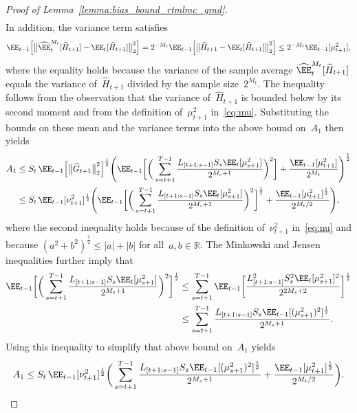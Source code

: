 \documentclass[11pt]{article}
\let\hat\widehat
\begin{document}
\begin{proof}[Proof of Lemma~\ref{lemma:bias_bound_rtmlmc_grad}]
\begin{align*}
\end{align*}
In addition, the variance term satisfies
\begin{align*}
    \EE_{t-1}\Big[\big\|\hat\EE_t^{M_t}[\hat{H}_{t+1}]  - \EE_t[\hat{H}_{t+1}] \big\|_2^2 \Big] = 2^{-M_t} \EE_{t-1}\Big[\big\|\hat{H}_{t+1}  - \EE_t[\hat{H}_{t+1}] \big\|_2^2 \Big] \leq 2^{-M_t} \EE_{t-1}[\mu_{t+1}^{2}],
\end{align*}
where the equality holds because the variance of the sample average $\hat\EE_t^{M_t}[\hat{H}_{t+1}]$ equals the variance of~$\hat{H}_{t+1}$ divided by the sample size~$2^{M_t}$. The inequality follows from the observation that the variance of~$\hat{H}_{t+1}$ is bounded below by its second moment and from the definition of~$\mu_{t+1}^{2}$ in~\eqref{eq:mu}. Substituting the bounds on these mean and the variance terms into the above bound on~$A_1$ then yields
\begin{align*}
    A_1 &\leq S_t \, \EE_{t-1}\Big[\big\|\hat{G}_{t+1}\big\|_2^2\Big]^\frac{1}{2} \Bigg( \EE_{t-1}\bigg[\bigg(\sum_{s=t+1}^{T-1} \frac{L_{[t+1:s-1]} S_s \EE_t[\mu_{s+1}^2]}{2^{M_s + 1}}\bigg)^2\bigg] + \frac{\EE_{t-1}[\mu_{t+1}^2]}{2^{M_t}} \Bigg)^\frac{1}{2}\\
    & \leq S_t \, \EE_{t-1}[\nu_{t+1}^{2}]^\frac{1}{2} \Bigg( \EE_{t-1}\bigg[\bigg(\sum_{s=t+1}^{T-1} \frac{L_{[t+1:s-1]} S_s \EE_t[\mu_{s+1}^2]}{2^{M_s + 1}}\bigg)^2\bigg]^\frac{1}{2} + \frac{\EE_{t-1}[\mu_{t+1}^{2}]^\frac{1}{2}}{2^{M_t/2}} \Bigg),
\end{align*}
where the second inequality holds because of the definition of~$\nu_{t+1}^2$ in~\eqref{eq:nu} and because $(a^2+b^2)^\frac{1}{2} \leq |a| + |b|$ for all~$a,b\in\mathbb R$. The Minkowski and Jensen inequalities further imply that
\begin{align*}
    \EE_{t-1}\bigg[\bigg(\sum_{s=t+1}^{T-1} \frac{L_{[t+1:s-1]} S_s \EE_t[\mu_{s+1}^{2}]}{2^{M_s + 1}}\bigg)^2\bigg]^\frac{1}{2} 
    &\leq \sum_{s=t+1}^{T-1}\EE_{t-1}\bigg[ \frac{L_{[t+1:s-1]}^2 S_s^2 \EE_t[\mu_{s+1}^{2}]^2 }{2^{2M_s + 2}}\bigg]^\frac{1}{2} \\
    &\leq \sum_{s=t+1}^{T-1}\frac{L_{[t+1:s-1]} S_s \EE_{t-1}[(\mu_{s+1}^{2})^2]^\frac{1}{2}}{2^{M_s + 1}}.
\end{align*}
Using this inequality to simplify that above bound on~$A_1$ yields
\begin{align*}
    A_1 \leq S_t \, \EE_{t-1}[\nu_{t+1}^{2}]^\frac{1}{2} \bigg( \sum_{s=t+1}^{T-1} \frac{L_{[t+1:s-1]} S_s \EE_{t-1}[(\mu_{s+1}^{2})^2]^\frac{1}{2}}{2^{M_s + 1}} + \frac{\EE_{t-1}[\mu_{t+1}^{2}]^\frac{1}{2}}{2^{M_t/2}} \bigg).

\end{align*}
\end{proof}
\end{document}
